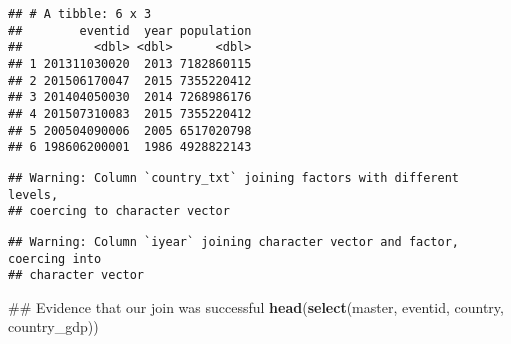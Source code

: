 \documentclass[11pt,letterpaper,]{article}
\newenvironment{Shaded}{\begin{snugshade}}{\end{snugshade}}
\newcommand{\KeywordTok}[1]{\textcolor[rgb]{0.13,0.29,0.53}{\textbf{{#1}}}}
\newcommand{\DataTypeTok}[1]{\textcolor[rgb]{0.13,0.29,0.53}{{#1}}}
\newcommand{\DecValTok}[1]{\textcolor[rgb]{0.00,0.00,0.81}{{#1}}}
\newcommand{\StringTok}[1]{\textcolor[rgb]{0.31,0.60,0.02}{{#1}}}
\newcommand{\NormalTok}[1]{{#1}}
\theoremstyle{definition}
\theoremstyle{definition}
\theoremstyle{definition}
\theoremstyle{remark}
\begin{document}
\begin{verbatim}
## # A tibble: 6 x 3
##        eventid  year population
##          <dbl> <dbl>      <dbl>
## 1 201311030020  2013 7182860115
## 2 201506170047  2015 7355220412
## 3 201404050030  2014 7268986176
## 4 201507310083  2015 7355220412
## 5 200504090006  2005 6517020798
## 6 198606200001  1986 4928822143
\end{verbatim}

\begin{Shaded}
\end{Shaded}

\begin{verbatim}
## Warning: Column `country_txt` joining factors with different levels,
## coercing to character vector
\end{verbatim}

\begin{verbatim}
## Warning: Column `iyear` joining character vector and factor, coercing into
## character vector
\end{verbatim}

\begin{Shaded}
\begin{Highlighting}[]
\NormalTok{## Evidence that our join was successful}
\KeywordTok{head}\NormalTok{(}\KeywordTok{select}\NormalTok{(master, eventid, country, country_gdp))}
\end{Highlighting}
\end{Shaded}
\end{document}
